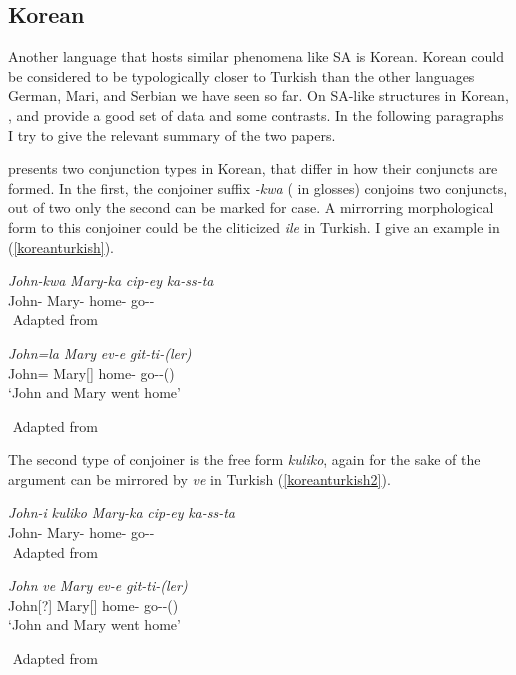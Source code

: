 \subsection{Korean}

Another language that hosts similar phenomena like SA is Korean. Korean could be considered to be typologically closer to Turkish than the other languages German, Mari, and Serbian we have seen so far. On SA-like structures in Korean, \cite{yoon2005conjunction}, and \cite{yoon2017lexical} provide a good set of data and some contrasts. In the following paragraphs I try to give the relevant summary of the two papers.

\cite{yoon2005conjunction} presents two conjunction types in Korean, that differ in how their conjuncts are formed. In the first, the conjoiner suffix \textit{-kwa} ({\Conj} in glosses) conjoins two conjuncts, out of two only the second can be marked for case. A mirrorring morphological form to this conjoiner could be the cliticized \textit{ile} in Turkish. I give an example in (\ref{koreanturkish}).

\begin{exe}
    \ex \label{koreanturkish}
    \begin{xlist}
        \ex
        \gll 
        \textit{John-kwa} \textit{Mary-ka} \textit{cip-ey} \textit{ka-ss-ta} \\ John-{\Conj} Mary-{\Nom} home-{\Loc} go-{\Pst}-{\Decl} \\
        ${}$ \hfill Adapted from \cite{yoon2005conjunction}

        \ex 
        \gll 
        \textit{John=la} \textit{Mary} \textit{ev-e} \textit{git-ti-(ler)} \\ John={\And} Mary[{\Nom}] home-{\Dat} go-{\Pst}-({\Third}{\Pl}) \\
        \glt `John and Mary went home'
    \end{xlist}
    ${}$ \hfill Adapted from \cite{yoon2005conjunction}
\end{exe}

The second type of conjoiner is the free form \textit{kuliko}, again for the sake of the argument can be mirrored by \textit{ve} in Turkish (\ref{koreanturkish2}).

\begin{exe}
    \ex \label{koreanturkish2}
    \begin{xlist}
        \ex 
        \gll 
        \textit{John-i} \textit{kuliko} \textit{Mary-ka} \textit{cip-ey} \textit{ka-ss-ta} \\ John-{\Nom} {\And} Mary-{\Nom} home-{\Loc} go-{\Pst}-{\Decl} \\
        ${}$ \hfill Adapted from \cite{yoon2005conjunction}
        
        \ex 
        \gll 
        \textit{John} \textit{ve} \textit{Mary} \textit{ev-e} \textit{git-ti-(ler)} \\ John[?{\Nom}] {\And} Mary[{\Nom}] home-{\Dat} go-{\Pst}-({\Third}{\Pl}) \\
        \glt `John and Mary went home'
    \end{xlist}
    ${}$ \hfill Adapted from \cite{yoon2005conjunction}
\end{exe}

